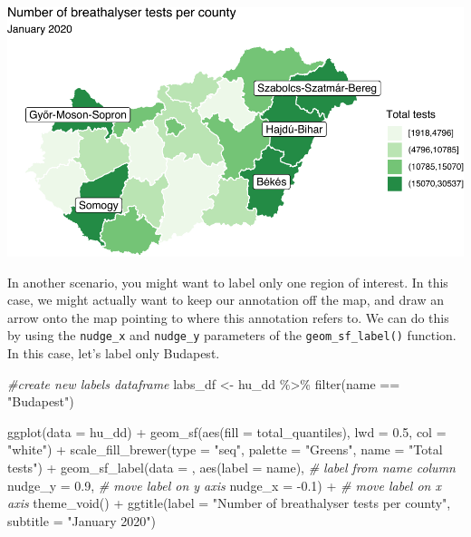 \documentclass[
]{book}
\newenvironment{Shaded}{\begin{snugshade}}{\end{snugshade}}
\newcommand{\AttributeTok}[1]{\textcolor[rgb]{0.77,0.63,0.00}{#1}}
\newcommand{\CommentTok}[1]{\textcolor[rgb]{0.56,0.35,0.01}{\textit{#1}}}
\newcommand{\FloatTok}[1]{\textcolor[rgb]{0.00,0.00,0.81}{#1}}
\newcommand{\FunctionTok}[1]{\textcolor[rgb]{0.00,0.00,0.00}{#1}}
\newcommand{\NormalTok}[1]{#1}
\newcommand{\OtherTok}[1]{\textcolor[rgb]{0.56,0.35,0.01}{#1}}
\newcommand{\SpecialCharTok}[1]{\textcolor[rgb]{0.00,0.00,0.00}{#1}}
\newcommand{\StringTok}[1]{\textcolor[rgb]{0.31,0.60,0.02}{#1}}
\begin{document}
\includegraphics{crime_mapping_files/figure-latex/addcountynamestoponly-1.pdf}

In another scenario, you might want to label only one region of interest. In this case, we might actually want to keep our annotation off the map, and draw an arrow onto the map pointing to where this annotation refers to. We can do this by using the \texttt{nudge\_x} and \texttt{nudge\_y} parameters of the \texttt{geom\_sf\_label()} function. In this case, let's label only Budapest.

\begin{Shaded}
\begin{Highlighting}[]
\CommentTok{\#create new labels dataframe}
\NormalTok{labs\_df }\OtherTok{\textless{}{-}}\NormalTok{ hu\_dd }\SpecialCharTok{\%\textgreater{}\%} \FunctionTok{filter}\NormalTok{(name }\SpecialCharTok{==} \StringTok{"Budapest"}\NormalTok{)}

\FunctionTok{ggplot}\NormalTok{(}\AttributeTok{data =}\NormalTok{ hu\_dd) }\SpecialCharTok{+} 
  \FunctionTok{geom\_sf}\NormalTok{(}\FunctionTok{aes}\NormalTok{(}\AttributeTok{fill =}\NormalTok{ total\_quantiles), }
          \AttributeTok{lwd =} \FloatTok{0.5}\NormalTok{, }\AttributeTok{col =} \StringTok{"white"}\NormalTok{) }\SpecialCharTok{+} 
  \FunctionTok{scale\_fill\_brewer}\NormalTok{(}\AttributeTok{type =} \StringTok{"seq"}\NormalTok{, }
                    \AttributeTok{palette =} \StringTok{"Greens"}\NormalTok{,}
                    \AttributeTok{name =} \StringTok{"Total tests"}\NormalTok{) }\SpecialCharTok{+} 
  \FunctionTok{geom\_sf\_label}\NormalTok{(}\AttributeTok{data =}\NormalTok{ , }\FunctionTok{aes}\NormalTok{(}\AttributeTok{label =}\NormalTok{ name), }\CommentTok{\# label from name column}
                \AttributeTok{nudge\_y =} \FloatTok{0.9}\NormalTok{,  }\CommentTok{\# move label on y axis}
                \AttributeTok{nudge\_x =} \SpecialCharTok{{-}}\FloatTok{0.1}\NormalTok{) }\SpecialCharTok{+} \CommentTok{\# move label on x axis}
  \FunctionTok{theme\_void}\NormalTok{() }\SpecialCharTok{+} 
  \FunctionTok{ggtitle}\NormalTok{(}\AttributeTok{label =} \StringTok{"Number of breathalyser tests per county"}\NormalTok{, }
          \AttributeTok{subtitle =} \StringTok{"January 2020"}\NormalTok{)}
\end{Highlighting}
\end{Shaded}
\end{document}

